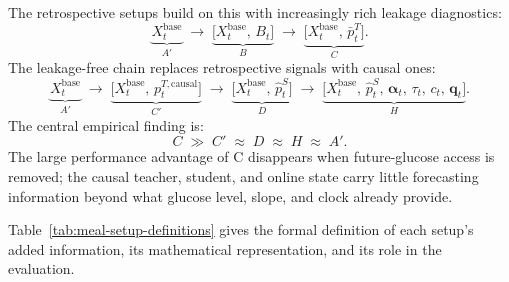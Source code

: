 The retrospective setups build on this with increasingly rich leakage diagnostics:
\begin{equation}
    \underbrace{X_t^{\mathrm{base}}}_{A'}
    \;\longrightarrow\;
    \underbrace{\bigl[X_t^{\mathrm{base}},\,B_t\bigr]}_{B}
    \;\longrightarrow\;
    \underbrace{\bigl[X_t^{\mathrm{base}},\,\bar{p}_t^T\bigr]}_{C}.
    \label{eq:meal-retro-chain}
\end{equation}
The leakage-free chain replaces retrospective signals with causal ones:
\begin{equation}
    \underbrace{X_t^{\mathrm{base}}}_{A'}
    \;\longrightarrow\;
    \underbrace{\bigl[X_t^{\mathrm{base}},\,p_t^{T,\mathrm{causal}}\bigr]}_{C'}
    \;\longrightarrow\;
    \underbrace{\bigl[X_t^{\mathrm{base}},\,\widehat{p}_t^S\bigr]}_{D}
    \;\longrightarrow\;
    \underbrace{\bigl[X_t^{\mathrm{base}},\,\widehat{p}_t^S,\,\boldsymbol{\alpha}_t,\,\tau_t,\,c_t,\,\mathbf{q}_t\bigr]}_{H}.
    \label{eq:meal-causal-chain}
\end{equation}
The central empirical finding is:
\begin{equation}
    C \;\gg\; C' \;\approx\; D \;\approx\; H \;\approx\; A'.
    \label{eq:meal-central-comparison}
\end{equation}
The large performance advantage of C disappears when future-glucose access is removed; the
causal teacher, student, and online state carry little forecasting information beyond what
glucose level, slope, and clock already provide.

Table~\ref{tab:meal-setup-definitions} gives the formal definition of each setup's added
information, its mathematical representation, and its role in the evaluation.

